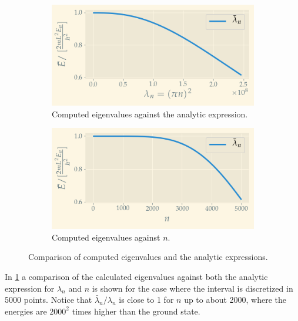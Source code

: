 \begin{figure}[tb]
	\centering
	\begin{subfigure}{0.5\textwidth}
	\centering
	\includegraphics[width=\linewidth]{img/e_vs_lambda_N=5000}
	\caption{Computed eigenvalues against the analytic expression.}
	\end{subfigure}
	\hfill
	\begin{subfigure}{0.5\textwidth}
	\centering
	\includegraphics[width=\linewidth]{img/e_vs_n_N=5000}
	\caption{Computed eigenvalues against $n$.}
	\end{subfigure}
	\caption{Comparison of computed eigenvalues and the analytic expressions. }
	\label{fig:energy_comparison}
\end{figure}
In \cref{fig:energy_comparison} a comparison of the calculated eigenvalues against both the analytic expression for $\lambda_n$ and $n$ is shown for the case where the interval is discretized in 5000 points.  Notice that $\bar\lambda_n / \lambda_n$ is close to 1 for $n$ up to about 2000, where the energies are $2000^2$ times higher than the ground state.


